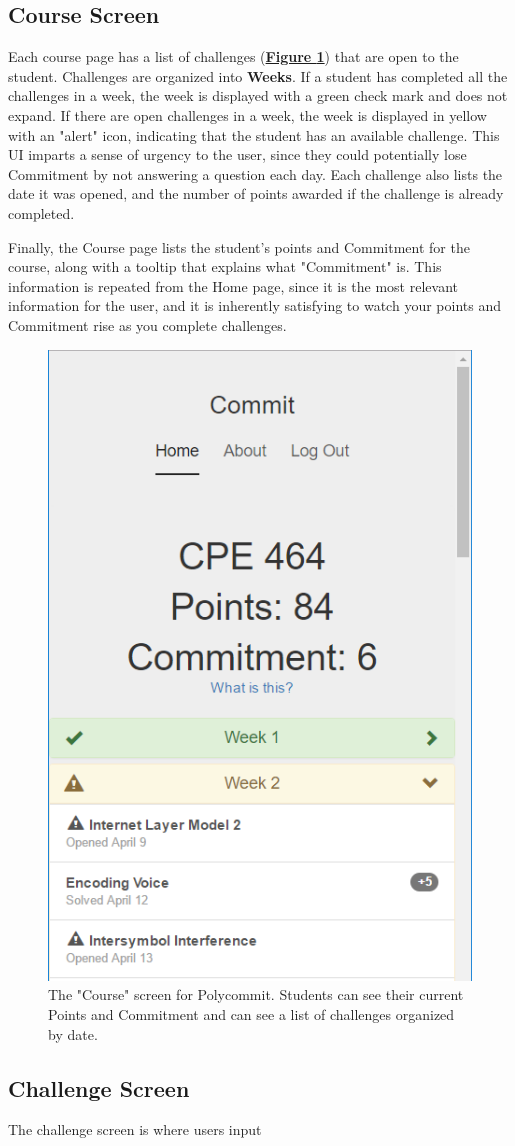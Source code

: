 \subsection{Course Screen}
\par Each course page has a list of challenges (\textbf{\hyperref[fig:polycommit2]{Figure \ref*{fig:polycommit2}}}) that are open to the student. Challenges are organized into \textbf{Weeks}. If a student has completed all the challenges in a week, the week is displayed with a green check mark and does not expand. If there are open challenges in a week, the week is displayed in yellow with an "alert" icon, indicating that the student has an available challenge. This UI imparts a sense of urgency to the user, since they could potentially lose Commitment by not answering a question each day. Each challenge also lists the date it was opened, and the number of points awarded if the challenge is already completed.

\par Finally, the Course page lists the student's points and Commitment for the course, along with a tooltip that explains what "Commitment" is. This information is repeated from the Home page, since it is the most relevant information for the user, and it is inherently satisfying to watch your points and Commitment rise as you complete challenges.

\begin{figure}
	\includegraphics{figures/polycommit-challenges}
	\caption{The "Course" screen for Polycommit. Students can see their current Points and Commitment and can see a list of challenges organized by date.}
	\label{fig:polycommit2}
\end{figure}

\subsection{Challenge Screen}
\par The challenge screen is where users input 